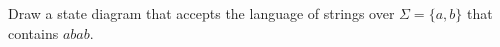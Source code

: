 Draw a state diagram that accepts the language of strings over 
$\Sigma = \{a, b\}$ that contains $abab$.
